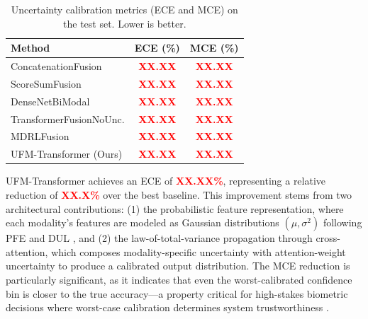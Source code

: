 \documentclass[10pt,journal,compsoc]{IEEEtran}
\begin{document}
\begin{table}[htbp]
\centering
\caption{Uncertainty calibration metrics (ECE and MCE) on the test set. Lower is better.}
\label{tab:calibration}
\begin{tabular}{l c c}
\hline
\textbf{Method} & \textbf{ECE (\%)} & \textbf{MCE (\%)} \\
\hline
ConcatenationFusion & \textcolor{red}{\textbf{XX.XX}} & \textcolor{red}{\textbf{XX.XX}} \\ %
ScoreSumFusion & \textcolor{red}{\textbf{XX.XX}} & \textcolor{red}{\textbf{XX.XX}} \\ %
DenseNetBiModal & \textcolor{red}{\textbf{XX.XX}} & \textcolor{red}{\textbf{XX.XX}} \\ %
TransformerFusionNoUnc. & \textcolor{red}{\textbf{XX.XX}} & \textcolor{red}{\textbf{XX.XX}} \\ %
MDRLFusion & \textcolor{red}{\textbf{XX.XX}} & \textcolor{red}{\textbf{XX.XX}} \\ %
\hline
UFM-Transformer (Ours) & \textcolor{red}{\textbf{XX.XX}} & \textcolor{red}{\textbf{XX.XX}} \\ %
\hline
\end{tabular}
\end{table}

UFM-Transformer achieves an ECE of \textcolor{red}{\textbf{XX.XX\%}}, %
representing a relative reduction of \textcolor{red}{\textbf{XX.X\%}} over the best baseline. %
This improvement stems from two architectural contributions: (1) the probabilistic feature representation, where each modality's features are modeled as Gaussian distributions $(\mu, \sigma^2)$ following PFE \cite{shi2019pfe} and DUL \cite{chang2020dul}, and (2) the law-of-total-variance propagation through cross-attention, which composes modality-specific uncertainty with attention-weight uncertainty to produce a calibrated output distribution. The MCE reduction is particularly significant, as it indicates that even the worst-calibrated confidence bin is closer to the true accuracy---a property critical for high-stakes biometric decisions where worst-case calibration determines system trustworthiness \cite{conti2024uncertainty}.
\end{document}
